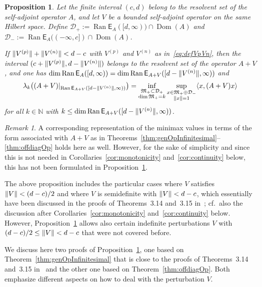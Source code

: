 \documentclass[11pt,a4paper]{amsart}
\numberwithin{equation}{section}
\DeclareMathOperator{\Ran}{Ran}
\DeclareMathOperator{\Dom}{Dom}
\DeclarePairedDelimiter{\norm}{\lVert}{\rVert}
\DeclarePairedDelimiter{\scprod}{\langle}{\rangle}
\newcommand{\NN}{\mathbb{N}}
\newcommand{\EE}{\mathsf{E}}
\newcommand{\cD}{{\mathcal D}}
\newcommand{\fM}{{\mathfrak M}}
\theoremstyle{plain}
\newtheorem{proposition}[theorem]{Proposition}
\theoremstyle{definition}
\theoremstyle{remark}
\newtheorem{remark}[theorem]{Remark}
\begin{document}
\begin{proposition}\label{prop:boundedPert}
  Let the finite interval $(c,d)$ belong to the resolvent set of the self-adjoint operator $A$, and let $V$ be a bounded
  self-adjoint operator on the same Hilbert space. Define $\cD_+ := \Ran \EE_A([d,\infty)) \cap \Dom(A)$ and
  $\cD_- := \Ran \EE_A((-\infty,c]) \cap \Dom(A)$.

  If $\norm{V^{(p)}} + \norm{V^{(n)}} < d - c$ with $V^{(p)}$ and $V^{(n)}$ as in~\eqref{eq:defVpVn}, then the interval
  $(c+\norm{V^{(p)}} , d-\norm{V^{(n)}})$ belongs to the resolvent set of the operator $A + V$, and one has
  $\dim\Ran \EE_A([d,\infty)) = \dim \Ran\EE_{A+V}([d-\norm{V^{(n)}},\infty))$ and
  \begin{equation*}
    \lambda_k\bigl ((A+V)|_{\Ran\EE_{A+V}([d-\norm{V^{(n)}},\infty))} \bigr)
    =
    \inf_{\substack{\fM_+ \subset \cD_+\\ \dim\fM_+ = k}} \sup_{\substack{x \in \fM_+ \oplus \cD_-\\ \norm{x}=1}}
      \scprod{ x , (A+V)x }
  \end{equation*}
  for all $k \in \NN$ with $k \le \dim \Ran\EE_{A+V}([d-\norm{V^{(n)}},\infty))$.
\end{proposition}

\begin{remark}
  A corresponding representation of the minimax values in terms of the form associated with $A+V$ as in
  Theorems~\ref{thm:genOpInfinitesimal}--\ref{thm:offdiagOp} holds here as well. However, for the sake of simplicity and since
  this is not needed in Corollaries~\ref{cor:monotonicity} and~\ref{cor:continuity} below, this has not been formulated in
  Proposition~\ref{prop:boundedPert}.
\end{remark}

The above proposition includes the particular cases where $V$ satisfies $\norm{V} < (d - c)/2$ and where $V$ is semidefinite with
$\norm{V} < d - c$, which essentially have been discussed in the proofs of Theorems~3.14 and~3.15 in~\cite{NSTTV18}; cf.~also the
discussion after Corollaries~\ref{cor:monotonicity} and~\ref{cor:continuity} below. However, Proposition~\ref{prop:boundedPert}
allows also certain indefinite perturbations $V$ with $(d - c)/2 \le \norm{V} < d - c$ that were not covered before.

We discuss here two proofs of Proposition~\ref{prop:boundedPert}, one based on Theorem~\ref{thm:genOpInfinitesimal} that is close
to the proofs of Theorems~3.14 and~3.15 in~\cite{NSTTV18} and the other one based on Theorem~\ref{thm:offdiagOp}. Both emphasize
different aspects on how to deal with the perturbation $V$.
\end{document}

